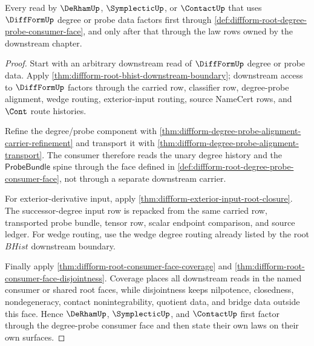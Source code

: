 \begin{theorem}
\label{thm:diffform-root-degree-probe-face-downstream-factorization}
Every read by $\DeRhamUp$, $\SymplecticUp$, or $\ContactUp$ that uses
$\DiffFormUp$ degree or probe data factors first through
\autoref{def:diffform-root-degree-probe-consumer-face}, and only after that
through the law rows owned by the downstream chapter.
\end{theorem}
\begin{proof}
Start with an arbitrary downstream read of $\DiffFormUp$ degree or probe data.
Apply \autoref{thm:diffform-root-bhist-downstream-boundary}; downstream access
to $\DiffFormUp$ factors through the carried row, classifier row,
degree-probe alignment, wedge routing, exterior-input routing, source NameCert
rows, and $\Cont$ route histories.

Refine the degree/probe component with
\autoref{thm:diffform-degree-probe-alignment-carrier-refinement} and transport
it with \autoref{thm:diffform-degree-probe-alignment-transport}. The consumer
therefore reads the unary degree history and the $\mathsf{ProbeBundle}$ spine
through the face defined in
\autoref{def:diffform-root-degree-probe-consumer-face}, not through a separate
downstream carrier.

For exterior-derivative input, apply
\autoref{thm:diffform-exterior-input-root-closure}. The successor-degree input
row is repacked from the same carried row, transported probe bundle, tensor
row, scalar endpoint comparison, and source ledger. For wedge routing, use the
wedge degree routing already listed by the root $BHist$ downstream boundary.

Finally apply \autoref{thm:diffform-root-consumer-face-coverage} and
\autoref{thm:diffform-root-consumer-face-disjointness}. Coverage places all
downstream reads in the named consumer or shared root faces, while disjointness
keeps nilpotence, closedness, nondegeneracy, contact nonintegrability, quotient
data, and bridge data outside this face. Hence $\DeRhamUp$, $\SymplecticUp$,
and $\ContactUp$ first factor through the degree-probe consumer face and then
state their own laws on their own surfaces.
\end{proof}
